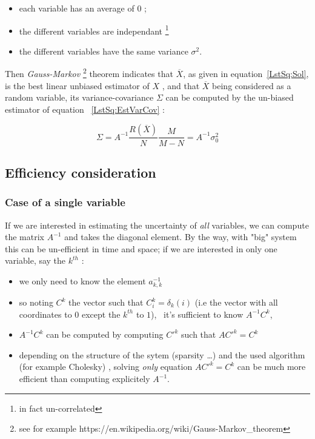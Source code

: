 \begin{itemize}
    \item each variable has an average of $0$ ;
    \item  the different variables are independant \footnote{in fact un-correlated}
    \item  the different variables have  the same variance $\sigma ^2$.
\end{itemize}

Then \emph{Gauss-Markov} \footnote{see for example https://en.wikipedia.org/wiki/Gauss-Markov\_theorem}
theorem indicates that $\overline X$, as given in equation~\ref{LstSq:Sol}, is the 
best linear unbiased estimator of $X$ , and that $\overline X$ being considered as a random
variable, its variance-covariance $\Sigma$ can be computed by the un-biased estimator of
equation ~\ref{LstSq:EstVarCov} :

\begin{equation}
	\Sigma = A^{-1}  \frac{R(\overline X)}{N}  \frac{M}{M-N} = A^{-1} \sigma_0^2 \label{LstSq:EstVarCov}
\end{equation}

\subsection{Efficiency consideration}

\subsubsection{Case of a single variable}

If we are interested in estimating the uncertainty of \emph{all} variables, we can
compute the matrix $A^{-1}$ and takes the diagonal element. By the way, with "big"
system this can be un-efficient in time and space; if we are
interested in only one variable, say the $k^{th}$ :

\begin{itemize}
    \item  we only need to know the element $a^{-1}_{k,k}$
    \item  so noting $C^k$ the 
	   vector such that $C^k_i =\delta_k(i)$  (i.e the vector with all coordinates to $0$
           except  the $k^{th}$ to $1$), \ it's sufficient to know $A^{-1} C^k$,
    \item  $A^{-1} C^k$ can be  computed by computing $C'^k$ such that $A C'^k = C^k$
    \item  depending on the structure of the sytem (sparsity \dots) and the used
	    algorithm (for example Cholesky) , solving \emph{only} equation $A C'^k = C^k$
		can be much more efficient than computing explicitely $A^{-1}$.
\end{itemize}

